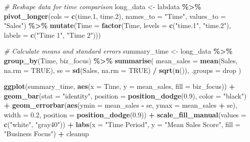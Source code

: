 \documentclass[
]{article}
\newenvironment{Shaded}{\begin{snugshade}}{\end{snugshade}}
\newcommand{\AttributeTok}[1]{\textcolor[rgb]{0.13,0.29,0.53}{#1}}
\newcommand{\CommentTok}[1]{\textcolor[rgb]{0.56,0.35,0.01}{\textit{#1}}}
\newcommand{\ConstantTok}[1]{\textcolor[rgb]{0.56,0.35,0.01}{#1}}
\newcommand{\FloatTok}[1]{\textcolor[rgb]{0.00,0.00,0.81}{#1}}
\newcommand{\FunctionTok}[1]{\textcolor[rgb]{0.13,0.29,0.53}{\textbf{#1}}}
\newcommand{\NormalTok}[1]{#1}
\newcommand{\OtherTok}[1]{\textcolor[rgb]{0.56,0.35,0.01}{#1}}
\newcommand{\SpecialCharTok}[1]{\textcolor[rgb]{0.81,0.36,0.00}{\textbf{#1}}}
\newcommand{\StringTok}[1]{\textcolor[rgb]{0.31,0.60,0.02}{#1}}
\begin{document}
\begin{Shaded}
\begin{Highlighting}[]
\CommentTok{\# Reshape data for time comparison}
\NormalTok{long\_data }\OtherTok{\textless{}{-}}\NormalTok{ labdata }\SpecialCharTok{\%\textgreater{}\%}
  \FunctionTok{pivot\_longer}\NormalTok{(}\AttributeTok{cols =} \FunctionTok{c}\NormalTok{(time}\FloatTok{.1}\NormalTok{, time}\FloatTok{.2}\NormalTok{), }
               \AttributeTok{names\_to =} \StringTok{"Time"}\NormalTok{, }
               \AttributeTok{values\_to =} \StringTok{"Sales"}\NormalTok{) }\SpecialCharTok{\%\textgreater{}\%}
  \FunctionTok{mutate}\NormalTok{(}\AttributeTok{Time =} \FunctionTok{factor}\NormalTok{(Time, }
                       \AttributeTok{levels =} \FunctionTok{c}\NormalTok{(}\StringTok{"time.1"}\NormalTok{, }\StringTok{"time.2"}\NormalTok{),}
                       \AttributeTok{labels =} \FunctionTok{c}\NormalTok{(}\StringTok{"Time 1"}\NormalTok{, }\StringTok{"Time 2"}\NormalTok{)))}

\CommentTok{\# Calculate means and standard errors}
\NormalTok{summary\_time }\OtherTok{\textless{}{-}}\NormalTok{ long\_data }\SpecialCharTok{\%\textgreater{}\%}
  \FunctionTok{group\_by}\NormalTok{(Time, biz\_focus) }\SpecialCharTok{\%\textgreater{}\%}
  \FunctionTok{summarise}\NormalTok{(}
    \AttributeTok{mean\_sales =} \FunctionTok{mean}\NormalTok{(Sales, }\AttributeTok{na.rm =} \ConstantTok{TRUE}\NormalTok{),}
    \AttributeTok{se =} \FunctionTok{sd}\NormalTok{(Sales, }\AttributeTok{na.rm =} \ConstantTok{TRUE}\NormalTok{) }\SpecialCharTok{/} \FunctionTok{sqrt}\NormalTok{(}\FunctionTok{n}\NormalTok{()),}
    \AttributeTok{.groups =} \StringTok{\textquotesingle{}drop\textquotesingle{}}
\NormalTok{  )}

\FunctionTok{ggplot}\NormalTok{(summary\_time, }\FunctionTok{aes}\NormalTok{(}\AttributeTok{x =}\NormalTok{ Time, }\AttributeTok{y =}\NormalTok{ mean\_sales, }\AttributeTok{fill =}\NormalTok{ biz\_focus)) }\SpecialCharTok{+}
  \FunctionTok{geom\_bar}\NormalTok{(}\AttributeTok{stat =} \StringTok{"identity"}\NormalTok{, }\AttributeTok{position =} \FunctionTok{position\_dodge}\NormalTok{(}\FloatTok{0.9}\NormalTok{), }\AttributeTok{color =} \StringTok{"black"}\NormalTok{) }\SpecialCharTok{+}
  \FunctionTok{geom\_errorbar}\NormalTok{(}\FunctionTok{aes}\NormalTok{(}\AttributeTok{ymin =}\NormalTok{ mean\_sales }\SpecialCharTok{{-}}\NormalTok{ se, }\AttributeTok{ymax =}\NormalTok{ mean\_sales }\SpecialCharTok{+}\NormalTok{ se),}
                \AttributeTok{width =} \FloatTok{0.2}\NormalTok{, }\AttributeTok{position =} \FunctionTok{position\_dodge}\NormalTok{(}\FloatTok{0.9}\NormalTok{)) }\SpecialCharTok{+}
  \FunctionTok{scale\_fill\_manual}\NormalTok{(}\AttributeTok{values =} \FunctionTok{c}\NormalTok{(}\StringTok{"white"}\NormalTok{, }\StringTok{"gray40"}\NormalTok{)) }\SpecialCharTok{+}
  \FunctionTok{labs}\NormalTok{(}\AttributeTok{x =} \StringTok{"Time Period"}\NormalTok{, }
       \AttributeTok{y =} \StringTok{"Mean Sales Score"}\NormalTok{,}
       \AttributeTok{fill =} \StringTok{"Business Focus"}\NormalTok{) }\SpecialCharTok{+}
\NormalTok{  cleanup}
\end{Highlighting}
\end{Shaded}
\end{document}
